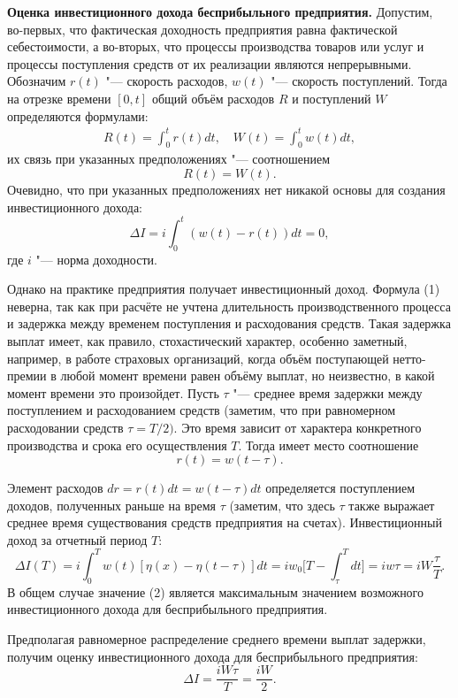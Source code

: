 {\bf Оценка инвестиционного дохода бесприбыльного предприятия.} Допустим,
во-первых, что фактическая доходность предприятия равна фактической
себестоимости, а во-вторых, что процессы производства товаров или услуг и
процессы поступления средств от их реализации являются непрерывными.
Обозначим $r(t)$ "--- скорость  расходов, $w(t)$ "--- скорость
 поступлений. Тогда на отрезке времени $[0, t]$ общий объём расходов $R$ и поступлений
$W$ определяются формулами:
\begin{gather*}
 R(t)=\int_0^t r(t)dt ,\quad
 W(t)=\int_0^t w(t)dt ,
\end{gather*}
их связь при указанных предположениях "--- соотношением
$$R(t)=W(t).$$
Очевидно, что при указанных предположениях нет никакой основы для создания
инвестиционного дохода:
\begin{equation}
 \Delta I=i\int_0^t \left( w(t)-r(t) \right)dt=0 ,
\end{equation}
где $i$ "--- норма доходности.

Однако на практике предприятия получает инвестиционный доход.
Формула (1) неверна, так как при расчёте не учтена длительность производственного
процесса и задержка между временем поступления и расходования средств. Такая
задержка выплат имеет, как правило, стохастический характер, особенно
заметный, например, в работе страховых организаций, когда объём поступающей
нетто-премии в любой момент времени равен объёму выплат, но неизвестно, в
какой момент времени это произойдет. Пусть $\tau $ "--- среднее время задержки
между поступлением и расходованием средств (заметим, что при равномерном
расходовании средств $\tau =T/2)$. Это время зависит от характера
конкретного производства и срока его осуществления $T$.
Тогда имеет место соотношение
$$r(t)=w(t-\tau ).$$

Элемент расходов $dr=r(t)dt=w(t-\tau )dt$
определяется поступлением доходов, полученных раньше на время $\tau $
(заметим, что здесь $\tau $ также выражает среднее время существования
средств предприятия на счетах). Инвестиционный доход за отчетный период $T$:
\begin{equation}
 \Delta I(T)=i\int_0^T w(t)[\eta (x)-\eta (t-\tau )]dt= iw_0 \Bigg[T-\int_\tau ^T dt\Bigg]=iw\tau =iW\frac{\tau }{T} .
\end{equation}
В общем случае значение (2) является максимальным значением возможного
инвестиционного дохода для бесприбыльного предприятия.

Предполагая равномерное распределение среднего времени выплат задержки,
получим оценку инвестиционного дохода для бесприбыльного предприятия:
$$\Delta I=\frac{iW\tau }{T}=\frac{iW}{2}.$$

